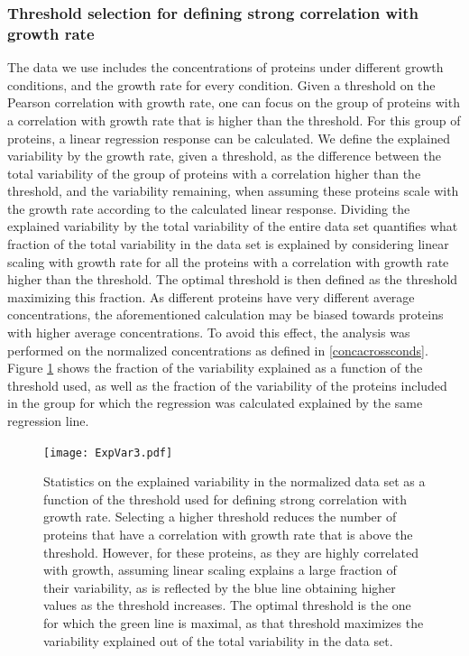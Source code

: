 \documentclass[notitlepage]{article}
\begin{document}
\subsubsection{Threshold selection for defining strong correlation with growth rate}
\label{corrthreshold}
The data we use includes the concentrations of proteins under different growth conditions, and the growth rate for every condition.
Given a threshold on the Pearson correlation with growth rate, one can focus on the group of proteins with a correlation with growth rate that is higher than the threshold.
For this group of proteins, a linear regression response can be calculated.
We define the explained variability by the growth rate, given a threshold, as the difference between the total variability of the group of proteins with a correlation higher than the threshold, and the variability remaining, when assuming these proteins scale with the growth rate according to the calculated linear response.
Dividing the explained variability by the total variability of the entire data set quantifies what fraction of the total variability in the data set is explained by considering linear scaling with growth rate for all the proteins with a correlation with growth rate higher than the threshold.
The optimal threshold is then defined as the threshold maximizing this fraction.
As different proteins have very different average concentrations, the aforementioned calculation may be biased towards proteins with higher average concentrations.
To avoid this effect, the analysis was performed on the normalized concentrations as defined in \ref{concacrossconds}.
Figure \ref{fig:threshold} shows the fraction of the variability explained as a function of the threshold used, as well as the fraction of the variability of the proteins included in the group for which the regression was calculated explained by the same regression line.
\begin{figure}[h]
\centering
\texttt{[image: ExpVar3.pdf]}
\caption{
  Statistics on the explained variability in the normalized data set as a function of the threshold used for defining strong correlation with growth rate.
  Selecting a higher threshold reduces the number of proteins that have a correlation with growth rate that is above the threshold.
  However, for these proteins, as they are highly correlated with growth, assuming linear scaling explains a large fraction of their variability, as is reflected by the blue line obtaining higher values as the threshold increases.
  The optimal threshold is the one for which the green line is maximal, as that threshold maximizes the variability explained out of the total variability in the data set.
}
\label{fig:threshold}
\end{figure}
\end{document}
